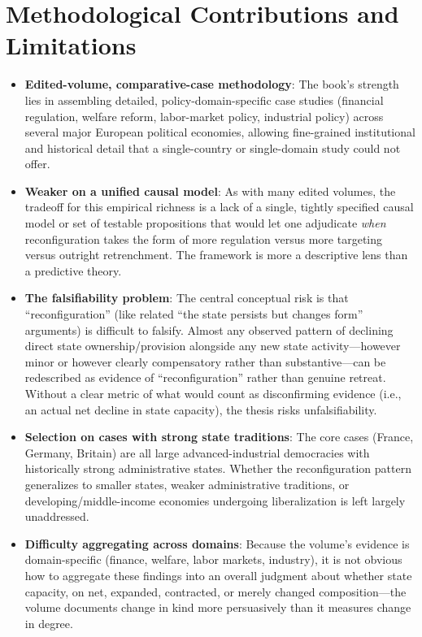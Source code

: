 \documentclass[12pt]{article}
\begin{document}
\section{Methodological Contributions and Limitations}

\begin{itemize}[leftmargin=*, itemsep=4pt]
    \item \textbf{Edited-volume, comparative-case methodology}: The book's strength lies in assembling detailed, policy-domain-specific case studies (financial regulation, welfare reform, labor-market policy, industrial policy) across several major European political economies, allowing fine-grained institutional and historical detail that a single-country or single-domain study could not offer.
    \item \textbf{Weaker on a unified causal model}: As with many edited volumes, the tradeoff for this empirical richness is a lack of a single, tightly specified causal model or set of testable propositions that would let one adjudicate \emph{when} reconfiguration takes the form of more regulation versus more targeting versus outright retrenchment. The framework is more a descriptive lens than a predictive theory.
    \item \textbf{The falsifiability problem}: The central conceptual risk is that ``reconfiguration'' (like related ``the state persists but changes form'' arguments) is difficult to falsify. Almost any observed pattern of declining direct state ownership/provision alongside any new state activity---however minor or however clearly compensatory rather than substantive---can be redescribed as evidence of ``reconfiguration'' rather than genuine retreat. Without a clear metric of what would count as disconfirming evidence (i.e., an actual net decline in state capacity), the thesis risks unfalsifiability.
    \item \textbf{Selection on cases with strong state traditions}: The core cases (France, Germany, Britain) are all large advanced-industrial democracies with historically strong administrative states. Whether the reconfiguration pattern generalizes to smaller states, weaker administrative traditions, or developing/middle-income economies undergoing liberalization is left largely unaddressed.
    \item \textbf{Difficulty aggregating across domains}: Because the volume's evidence is domain-specific (finance, welfare, labor markets, industry), it is not obvious how to aggregate these findings into an overall judgment about whether state capacity, on net, expanded, contracted, or merely changed composition---the volume documents change in kind more persuasively than it measures change in degree.
\end{itemize}
\end{document}
